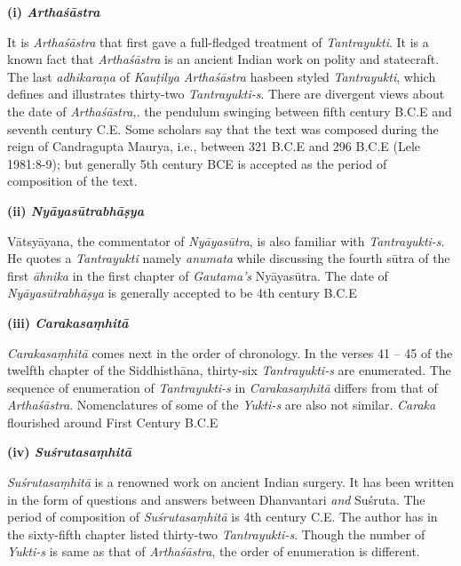 \newpage

\textbf{(i) \textit{Arthaśāstra}}

It is \textit{Arthaśāstra} that first gave a full-fledged treatment of \textit{Tantrayukti}. It is a known fact that \textit{Arthaśāstra} is an ancient Indian work on polity and statecraft. The last \textit{adhikaraṇa} of \textit{Kauṭilya Arthaśāstra} has\break been styled \textit{Tantrayukti}, which defines and illustrates thirty-two \textit{Tantrayukti-s}. There are divergent views about the date of \textit{Arthaśāstra,}. the pendulum swinging between fifth century B.C.E and seventh century C.E. Some scholars say that the text was composed during the reign of Candragupta Maurya, i.e., between 321 B.C.E and 296 B.C.E (Lele 1981:8-9); but generally 5th century BCE is accepted as the period of composition of the text.

\vskip 2pt

\textbf{(ii) \textit{Nyāyasūtrabhāṣya}}

Vātsyāyana, the commentator of \textit{Nyāyasūtra}, is also familiar with \textit{Tantrayukti-s}. He quotes a \textit{Tantrayukti} namely \textit{anumata} while discussing the fourth sūtra of the first \textit{āhnika} in the first chapter of \textit{Gautama’s} Nyāyasūtra. The date of \textit{Nyāyasūtrabhāṣya} is generally accepted to be 4th century B.C.E

\vskip 2pt

\textbf{(iii) \textit{Carakasaṃhitā}}

\textit{Carakasaṃhitā} comes next in the order of chronology. In the verses 41 – 45 of the twelfth chapter of the Siddhisthāna, thirty-six \textit{Tantrayukti-s} are enumerated. The sequence of enumeration of \textit{Tantrayukti-s} in \textit{Carakasaṃhitā} differs from that of \textit{Arthaśāstra}. Nomenclatures of some of the \textit{Yukti-s} are also not similar. \textit{Caraka} flourished around First Century B.C.E

\vskip 2pt

\textbf{(iv) \textit{Suśrutasaṃhitā}}

\textit{Suśrutasaṃhitā} is a renowned work on ancient Indian surgery. It has been written in the form of questions and answers between Dhanvantari \textit{and} Suśruta. The period of composition of \textit{Suśrutasaṃhitā} is 4th century C.E. The author has in the sixty-fifth chapter listed thirty-two \textit{Tantrayukti-s}. Though the number of \textit{Yukti-s} is same as that of \textit{Arthaśāstra}, the order of enumeration is different.

